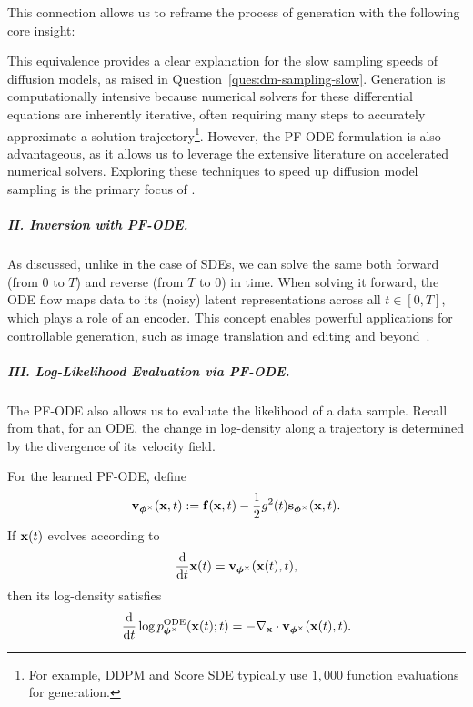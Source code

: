 This connection allows us to reframe the process of generation with the following core insight:

This equivalence provides a clear explanation for the slow sampling speeds of diffusion models, as raised in Question~\ref{ques:dm-sampling-slow}. Generation is computationally intensive because numerical solvers for these differential equations are inherently iterative, often requiring many steps to accurately approximate a solution trajectory\footnote{For example, DDPM and Score SDE typically use $1,000$ function evaluations for generation.}. However, the PF-ODE formulation is also advantageous, as it allows us to leverage the extensive literature on accelerated numerical solvers. Exploring these techniques to speed up diffusion model sampling is the primary focus of .



\subparagraph{II. Inversion with PF-ODE.} As discussed, unlike in the case of SDEs, we can solve the same  both forward (from $0$ to $T$) and reverse (from $T$ to $0$) in time. When solving it forward, the ODE flow maps data to its (noisy) latent representations across all $t \in [0,T]$, which plays a role of an encoder. This concept enables powerful applications for controllable generation, such as image translation and editing and beyond~\citep{mokady2023null,su2022dual}.

\subparagraph{III. Log-Likelihood Evaluation via PF-ODE.}
The PF-ODE also allows us to evaluate the likelihood of a data sample.
Recall from  that, for an ODE, the change in
log-density along a trajectory is determined by the divergence of its velocity
field.

For the learned PF-ODE, define
\[
{\mathbf{v}}_{\bm{\phi}^\times}({\mathbf{x}},t)
:=
{\mathbf{f}}({\mathbf{x}},t)
-\frac{1}{2}g^2(t){\mathbf{s}}_{\bm{\phi}^\times}({\mathbf{x}},t).
\]
If ${\mathbf{x}}(t)$ evolves according to
\[
\frac{\mathop{}\!\mathrm{d}}{\mathop{}\!\mathrm{d} t}{\mathbf{x}}(t)
=
{\mathbf{v}}_{\bm{\phi}^\times}({\mathbf{x}}(t),t),
\]
then its log-density satisfies
\[
\frac{\mathop{}\!\mathrm{d}}{\mathop{}\!\mathrm{d} t}
\log p^{\textup{ODE}}_{\bm{\phi}^\times}({\mathbf{x}}(t);t)
=
-\nabla_{{\mathbf{x}}}\cdot
{\mathbf{v}}_{\bm{\phi}^\times}({\mathbf{x}}(t),t).
\]

